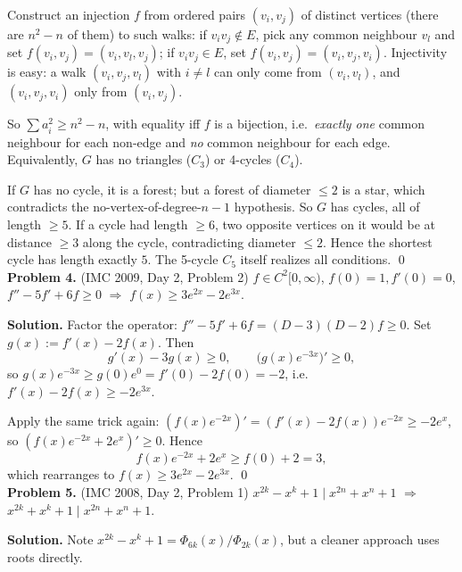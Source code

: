 \documentclass{article}
\begin{document}
Construct an injection \( f \) from ordered pairs \( (v_i, v_j) \) of distinct vertices (there are \( n^2 - n \) of them) to such walks: if \( v_i v_j \notin E \), pick any common neighbour \( v_l \) and set \( f(v_i, v_j) = (v_i, v_l, v_j) \); if \( v_i v_j \in E \), set \( f(v_i, v_j) = (v_i, v_j, v_i) \). Injectivity is easy: a walk \( (v_i, v_j, v_l) \) with \( i \neq l \) can only come from \( (v_i, v_l) \), and \( (v_i, v_j, v_i) \) only from \( (v_i, v_j) \).

So \( \sum a_i^2 \geq n^2 - n \), with equality iff \( f \) is a bijection, i.e.\ \emph{exactly one} common neighbour for each non-edge and \emph{no} common neighbour for each edge. Equivalently, \( G \) has no triangles (\( C_3 \)) or 4-cycles (\( C_4 \)).

If \( G \) has no cycle, it is a forest; but a forest of diameter \( \leq 2 \) is a star, which contradicts the no-vertex-of-degree-\( n-1 \) hypothesis. So \( G \) has cycles, all of length \( \geq 5 \). If a cycle had length \( \geq 6 \), two opposite vertices on it would be at distance \( \geq 3 \) along the cycle, contradicting diameter \( \leq 2 \). Hence the shortest cycle has length exactly \( 5 \). The 5-cycle \( C_5 \) itself realizes all conditions. \qed
\\

\textbf{Problem 4.} (IMC 2009, Day 2, Problem 2)
\( f \in C^2[0, \infty) \), \( f(0) = 1, f'(0) = 0 \), \( f'' - 5f' + 6f \geq 0 \) \( \Rightarrow \) \( f(x) \geq 3 e^{2x} - 2 e^{3x} \).

\textbf{Solution.}
Factor the operator: \( f'' - 5f' + 6f = (D - 3)(D - 2) f \geq 0 \). Set \( g(x) := f'(x) - 2 f(x) \). Then
\[
g'(x) - 3 g(x) \geq 0, \qquad \bigl(g(x) e^{-3x}\bigr)' \geq 0,
\]
so \( g(x) e^{-3x} \geq g(0) e^{0} = f'(0) - 2 f(0) = -2 \), i.e.\ \( f'(x) - 2 f(x) \geq -2 e^{3x} \).

Apply the same trick again: \( (f(x) e^{-2x})' = (f'(x) - 2 f(x)) e^{-2x} \geq -2 e^{x} \), so \( (f(x) e^{-2x} + 2 e^{x})' \geq 0 \). Hence
\[
f(x) e^{-2x} + 2 e^{x} \geq f(0) + 2 = 3,
\]
which rearranges to \( f(x) \geq 3 e^{2x} - 2 e^{3x} \). \qed
\\

\textbf{Problem 5.} (IMC 2008, Day 2, Problem 1)
\( x^{2k} - x^k + 1 \mid x^{2n} + x^n + 1 \) \( \Rightarrow \) \( x^{2k} + x^k + 1 \mid x^{2n} + x^n + 1 \).

\textbf{Solution.}
Note \( x^{2k} - x^k + 1 = \Phi_{6k}(x) / \Phi_{2k}(x) \), but a cleaner approach uses roots directly.
\end{document}
